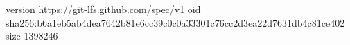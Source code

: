 version https://git-lfs.github.com/spec/v1
oid sha256:b6a1eb5ab4dea7642b81e6cc39c0c0a33301c76cc2d3ea22d7631db4c81ce402
size 1398246

